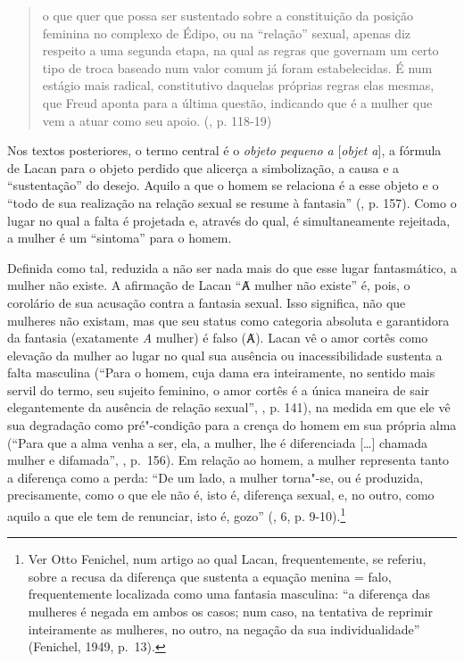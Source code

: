 \begin{quote}
o que quer que possa ser sustentado sobre a constituição da posição
feminina no complexo de Édipo, ou na ``relação'' sexual, apenas diz
respeito a uma segunda etapa, na qual as regras que governam um certo
tipo de troca baseado num valor comum já foram estabelecidas. É num
estágio mais radical, constitutivo daquelas próprias regras elas mesmas,
que Freud aponta para a última questão, indicando que é a mulher que vem
a atuar como seu apoio. (, p. 118-19)
\end{quote}

Nos textos posteriores, o termo central é o \emph{objeto pequeno a}
{[}\emph{objet a}{]}, a fórmula de Lacan para o objeto perdido que
alicerça a simbolização, a causa e a ``sustentação'' do desejo. Aquilo a
que o homem se relaciona é a esse objeto e o ``todo de sua realização na
relação sexual se resume à fantasia'' (, p. 157). Como o lugar
no qual a falta é projetada e, através do qual, é simultaneamente
rejeitada, a mulher é um ``sintoma'' para o homem.

Definida como tal, reduzida a não ser nada mais do que esse lugar
fantasmático, a mulher não existe. A afirmação de Lacan ``Ⱥ mulher não
existe'' é, pois, o corolário de sua acusação contra a fantasia sexual.
Isso significa, não que mulheres não existam, mas que seu status como
categoria absoluta e garantidora da fantasia (exatamente \emph{A}
mulher) é falso (Ⱥ). Lacan vê o amor cortês como elevação da mulher ao
lugar no qual sua ausência ou inacessibilidade sustenta a falta
masculina (``Para o homem, cuja dama era inteiramente, no sentido mais
servil do termo, seu sujeito feminino, o amor cortês é a única maneira
de sair elegantemente da ausência de relação sexual'', , p.
141), na medida em que ele vê sua degradação como pré"-condição para a
crença do homem em sua própria alma (``Para que a alma venha a ser, ela,
a mulher, lhe é diferenciada {[}\ldots{}{]} chamada mulher e difamada'',
, p.~156). Em relação ao homem, a mulher representa tanto a
diferença como a perda: ``De um lado, a mulher torna"-se, ou é produzida,
precisamente, como o que ele não é, isto é, diferença sexual, e, no
outro, como aquilo a que ele tem de renunciar, isto é, gozo'' (,
6, p. 9-10).\footnote{Ver Otto Fenichel, num artigo ao qual Lacan,
  frequentemente, se referiu, sobre a recusa da diferença que sustenta a
  equação menina = falo, frequentemente localizada como uma fantasia
  masculina: ``a diferença das mulheres é negada em ambos os casos; num
      caso, na tentativa de reprimir inteiramente as mulheres, no outro, na
      negação da sua individualidade'' (Fenichel, 1949, p.~13).}

